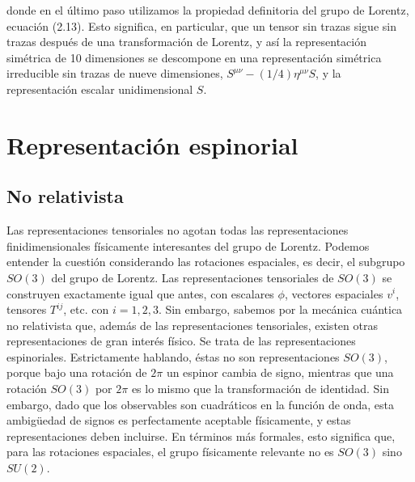                       donde en el último paso utilizamos la propiedad definitoria del grupo de Lorentz, ecuación (2.13). Esto significa, en particular, que un tensor sin trazas sigue sin trazas después de una transformación de Lorentz, y así la representación simétrica de 10 dimensiones se descompone en una representación simétrica irreducible sin trazas de nueve dimensiones, $S^{\mu \nu}-(1 / 4) \eta^{\mu \nu} S$, y la representación escalar unidimensional $S$.

                      \section{Representación espinorial}

                      \subsection{No relativista}
                      Las representaciones tensoriales no agotan todas las representaciones finidimensionales físicamente interesantes del grupo de Lorentz. Podemos entender la cuestión considerando las rotaciones espaciales, es decir, el subgrupo $S O(3)$ del grupo de Lorentz. Las representaciones tensoriales de $S O(3)$ se construyen exactamente igual que antes, con escalares $\phi$, vectores espaciales $v^{i}$, tensores $T^{i j}$, etc. con $i=1,2,3$. Sin embargo, sabemos por la mecánica cuántica no relativista que, además de las representaciones tensoriales, existen otras representaciones de gran interés físico. Se trata de las representaciones espinoriales. Estrictamente hablando, éstas no son representaciones $S O(3)$, porque bajo una rotación de $2 \pi$ un espinor cambia de signo, mientras que una rotación $S O(3)$ por $2 \pi$ es lo mismo que la transformación de identidad. Sin embargo, dado que los observables son cuadráticos en la función de onda, esta ambigüedad de signos es perfectamente aceptable físicamente, y estas representaciones deben incluirse. En términos más formales, esto significa que, para las rotaciones espaciales, el grupo físicamente relevante no es $S O(3)$ sino $S U(2)$.

